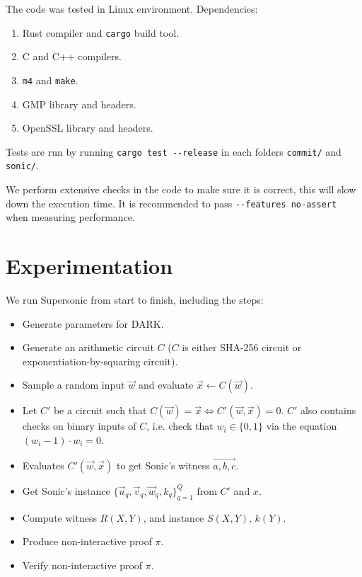 The code was tested in Linux environment. Dependencies:
\begin{enumerate}
    \item Rust compiler and \texttt{cargo} build tool.
    \item C and C++ compilers.
    \item \texttt{m4} and \texttt{make}.
    \item GMP library and headers.
    \item OpenSSL library and headers.
\end{enumerate}

Tests are run by running \texttt{cargo test -{}-release} in each folders \texttt{commit/} and \texttt{sonic/}.

We perform extensive checks in the code to make sure it is correct, this will slow down the execution time. It is recommended to pass \texttt{-{}-features no-assert} when measuring performance.

\section{Experimentation}

We run Supersonic from start to finish, including the steps:
\begin{itemize}
    \item Generate parameters for DARK.
    \item Generate an arithmetic circuit $C$ ($C$ is either SHA-256 circuit or exponentiation-by-squaring circuit).
    \item Sample a random input $\Vec{w}$ and evaluate $\Vec{x} \gets C(\Vec{w})$.
    \item Let $C'$ be a circuit such that $C(\Vec{w}) = \Vec{x} \iff C'(\Vec{w}, \Vec{x}) = 0$. $C'$ also contains checks on binary inputs of $C$, i.e. check that $w_i \in \{0, 1\}$ via the equation $(w_i - 1) \cdot w_i = 0$.
    \item Evaluates $C'(\Vec{w}, \Vec{x})$ to get Sonic's witness $\Vec{a, b, c}$.
    \item Get Sonic's instance $\{ \Vec{u}_q, \Vec{v}_q, \Vec{w}_q, k_q \}_{q=1}^{Q}$ from $C'$ and $x$.
    \item Compute witness $R(X, Y)$, and instance $S(X, Y)$, $k(Y)$.
    \item Produce non-interactive proof $\pi$.
    \item Verify non-interactive proof $\pi$.
\end{itemize}

